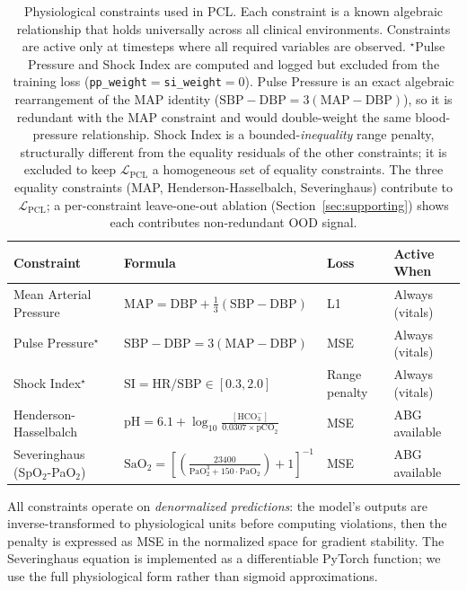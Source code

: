 \documentclass{article}
\begin{document}
\begin{table}[htbp]
\caption{Physiological constraints used in PCL. Each constraint is a known algebraic relationship that holds universally across all clinical environments. Constraints are active only at timesteps where all required variables are observed. $^\star$Pulse Pressure and Shock Index are computed and logged but excluded from the training loss (\texttt{pp\_weight}$=$\texttt{si\_weight}$=0$). Pulse Pressure is an exact algebraic rearrangement of the MAP identity ($\text{SBP}-\text{DBP}=3(\text{MAP}-\text{DBP})$), so it is redundant with the MAP constraint and would double-weight the same blood-pressure relationship. Shock Index is a bounded-\emph{inequality} range penalty, structurally different from the equality residuals of the other constraints; it is excluded to keep $\mathcal{L}_{\text{PCL}}$ a homogeneous set of equality constraints. The three equality constraints (MAP, Henderson-Hasselbalch, Severinghaus) contribute to $\mathcal{L}_{\text{PCL}}$; a per-constraint leave-one-out ablation (Section~\ref{sec:supporting}) shows each contributes non-redundant OOD signal.}
\label{tab:constraints}
\centering
\small
\begin{tabular}{@{}llll@{}}
\toprule
Constraint & Formula & Loss & Active When \\
\midrule
Mean Arterial Pressure & $\text{MAP} = \text{DBP} + \frac{1}{3}(\text{SBP} - \text{DBP})$ & L1 & Always (vitals) \\
Pulse Pressure$^\star$ & $\text{SBP} - \text{DBP} = 3(\text{MAP} - \text{DBP})$ & MSE & Always (vitals) \\
Shock Index$^\star$ & $\text{SI} = \text{HR} / \text{SBP} \in [0.3, 2.0]$ & Range penalty & Always (vitals) \\
Henderson-Hasselbalch & $\text{pH} = 6.1 + \log_{10}\frac{[\text{HCO}_3^-]}{0.0307 \times \text{pCO}_2}$ & MSE & ABG available \\
Severinghaus (SpO$_2$-PaO$_2$) & $\text{SaO}_2 = \left[\left(\frac{23400}{\text{PaO}_2^3 + 150 \cdot \text{PaO}_2}\right) + 1\right]^{-1}$ & MSE & ABG available \\
\bottomrule
\end{tabular}
\end{table}

All constraints operate on \emph{denormalized predictions}: the model's outputs are inverse-transformed to physiological units before computing violations, then the penalty is expressed as MSE in the normalized space for gradient stability.
The Severinghaus equation is implemented as a differentiable PyTorch function; we use the full physiological form rather than sigmoid approximations.
\end{document}
